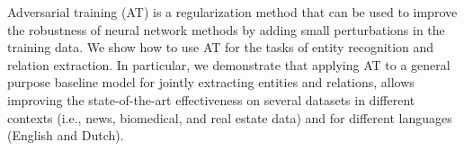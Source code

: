 Adversarial training (AT) is a regularization method that can be used to improve the robustness of neural network methods by adding small perturbations in the training data. We show how to use AT for the tasks of entity recognition and relation extraction. In particular, we demonstrate that applying AT to a general purpose baseline model for jointly extracting entities and relations, allows improving the state-of-the-art effectiveness on several datasets in different contexts (i.e., news, biomedical, and real estate data) and for different languages (English and Dutch).
